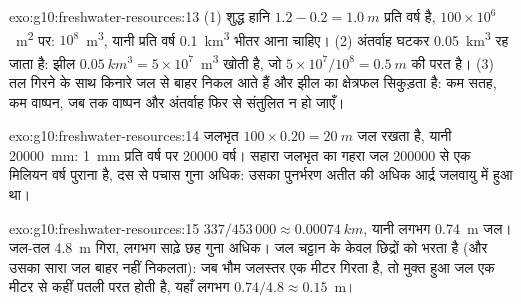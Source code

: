 \begin{solution}{exo:g10:freshwater-resources:13}
(1) शुद्ध हानि $1.2 - 0.2 = \qty{1.0}{m}$ प्रति वर्ष है,
$100 \times 10^6$~\unit{m^2} पर: $10^8$~\unit{m^3}, यानी प्रति वर्ष \qty{0.1}{km^3}
भीतर आना चाहिए। (2) अंतर्वाह घटकर \qty{0.05}{km^3} रह जाता है: झील
$\qty{0.05}{km^3} = 5 \times 10^7$~\unit{m^3} खोती है, जो
$5 \times 10^7/10^8 = \qty{0.5}{m}$ की परत है। (3) तल गिरने के साथ किनारे
जल से बाहर निकल आते हैं और झील का क्षेत्रफल सिकुड़ता है: कम सतह, कम
वाष्पन, जब तक वाष्पन और अंतर्वाह फिर से संतुलित न हो जाएँ।
\end{solution}

\begin{solution}{exo:g10:freshwater-resources:14}
जलभृत $100 \times 0.20 = \qty{20}{m}$ जल रखता है, यानी
\qty{20000}{mm}: \qty{1}{mm} प्रति वर्ष पर \num{20000} वर्ष। सहारा
जलभृत का गहरा जल \num{200000} से एक मिलियन वर्ष पुराना है, दस से पचास गुना
अधिक: उसका पुनर्भरण अतीत की अधिक आर्द्र जलवायु में हुआ था।
\end{solution}

\begin{solution}{exo:g10:freshwater-resources:15}
$337/453\,000 \approx \qty{0.00074}{km}$, यानी लगभग \qty{0.74}{m} जल।
जल-तल \qty{4.8}{m} गिरा, लगभग साढ़े छह गुना अधिक। जल
चट्टान के केवल छिद्रों को भरता है (और उसका सारा जल बाहर नहीं निकलता): जब
भौम जलस्तर एक मीटर गिरता है, तो मुक्त हुआ जल एक मीटर से कहीं पतली परत होती है,
यहाँ लगभग $0.74/4.8 \approx \num{0.15}$~m।
\end{solution}

